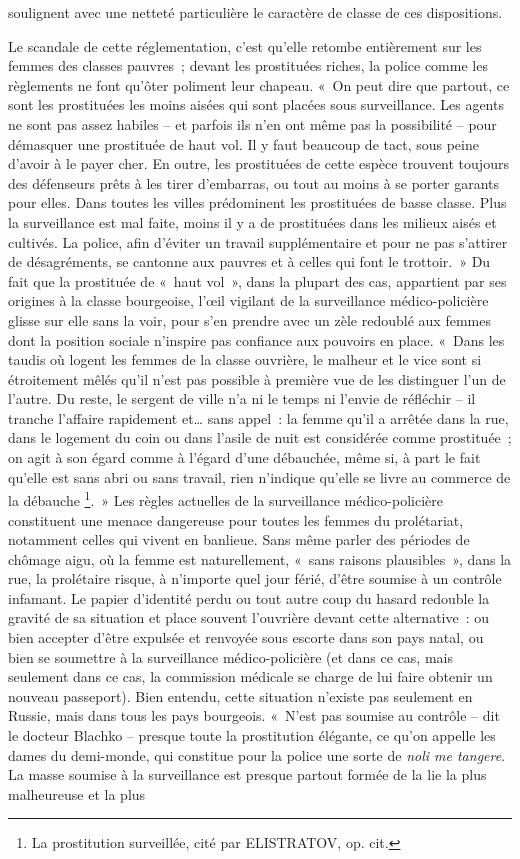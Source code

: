 \documentclass[french,twoside]{book} %
\begin{document}
soulignent avec une netteté particulière le caractère de classe de ces dispositions.\par
Le scandale de cette réglementation, c’est qu’elle retombe entièrement sur les femmes des classes pauvres ; devant les prostituées riches, la police comme les règlements ne font qu’ôter poliment leur chapeau. « On peut dire que partout, ce sont les prostituées les moins aisées qui sont placées sous surveillance. Les agents ne sont pas assez habiles – et parfois ils n’en ont même pas la possibilité – pour démasquer une prostituée de haut vol. Il y faut beaucoup de tact, sous peine d’avoir à le payer cher. En outre, les prostituées de cette espèce trouvent toujours des défenseurs prêts à les tirer d’embarras, ou tout au moins à se porter garants pour elles. Dans toutes les villes prédominent les prostituées de basse classe. Plus la surveillance est mal faite, moins il y a de prostituées dans les milieux aisés et cultivés. La police, afin d’éviter un travail supplémentaire et pour ne pas s’attirer de désagréments, se cantonne aux pauvres et à celles qui font le trottoir. » Du fait que la prostituée de « haut vol », dans la plupart des cas, appartient par ses origines à la classe bourgeoise, l’œil vigilant de la surveillance médico-policière glisse sur elle sans la voir, pour s’en prendre avec un zèle redoublé aux femmes dont la position sociale n’inspire pas confiance aux pouvoirs en place. « Dans les taudis où logent les femmes de la classe ouvrière, le malheur et le vice sont si étroitement mêlés qu’il n’est pas possible à première vue de les distinguer l’un de l’autre. Du reste, le sergent de ville n’a ni le temps ni l’envie de réfléchir – il tranche l’affaire rapidement et… sans appel : la femme qu’il a arrêtée dans la rue, dans le logement du coin ou dans l’asile de nuit est considérée comme prostituée ; on agit à son égard comme à l’égard d’une débauchée, même si, à part le fait qu’elle est sans abri ou sans travail, rien n’indique qu’elle se livre au commerce de la débauche \footnote{La prostitution surveillée, cité par ELISTRATOV, op. cit.}. » Les règles actuelles de la surveillance médico-policière constituent une menace dangereuse pour toutes les femmes du prolétariat, notamment celles qui vivent en banlieue. Sans même parler des périodes de chômage aigu, où la femme est naturellement, « sans raisons plausibles », dans la rue, la prolétaire risque, à n’importe quel jour férié, d’être soumise à un contrôle infamant. Le papier d’identité perdu ou tout autre coup du hasard redouble la gravité de sa situation et place souvent l’ouvrière devant cette alternative : ou bien accepter d’être expulsée et renvoyée sous escorte dans son pays natal, ou bien se soumettre à la surveillance médico-policière (et dans ce cas, mais seulement dans ce cas, la commission médicale se charge de lui faire obtenir un nouveau passeport). Bien entendu, cette situation n’existe pas seulement en Russie, mais dans tous les pays bourgeois. « N’est pas soumise au contrôle – dit le docteur Blachko – presque toute la prostitution élégante, ce qu’on appelle les dames du demi-monde, qui constitue pour la police une sorte de \emph{noli me tangere}. La masse soumise à la surveillance est presque partout formée de la lie la plus malheureuse et la plus 
\end{document}
